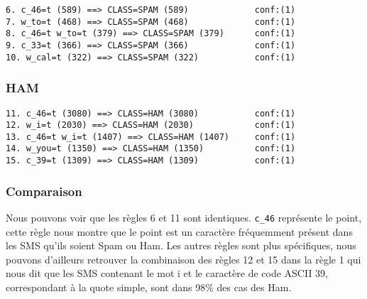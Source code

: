 \begin{verbatim}
6. c_46=t (589) ==> CLASS=SPAM (589)             conf:(1)
7. w_to=t (468) ==> CLASS=SPAM (468)             conf:(1)
8. c_46=t w_to=t (379) ==> CLASS=SPAM (379)      conf:(1)
9. c_33=t (366) ==> CLASS=SPAM (366)             conf:(1)
10. w_cal=t (322) ==> CLASS=SPAM (322)           conf:(1)
\end{verbatim}

\subsubsection{HAM}

\begin{verbatim}
11. c_46=t (3080) ==> CLASS=HAM (3080)           conf:(1)
12. w_i=t (2030) ==> CLASS=HAM (2030)            conf:(1)
13. c_46=t w_i=t (1407) ==> CLASS=HAM (1407)     conf:(1)
14. w_you=t (1350) ==> CLASS=HAM (1350)          conf:(1)
15. c_39=t (1309) ==> CLASS=HAM (1309)           conf:(1)
\end{verbatim}

\subsubsection{Comparaison}

Nous pouvons voir que les règles 6 et 11 sont identiques. \texttt{c\_46} représente le point, cette règle nous montre que le point est un caractère fréquemment présent dans les SMS qu'ils soient Spam ou Ham. Les autres règles sont plus spécifiques, nous pouvons d'ailleurs retrouver la combinaison des règles 12 et 15 dans la règle 1 qui nous dit que les SMS contenant le mot \og i \fg{} et le caractère de code ASCII 39, correspondant à la quote simple, sont dans 98\% des cas des Ham.
